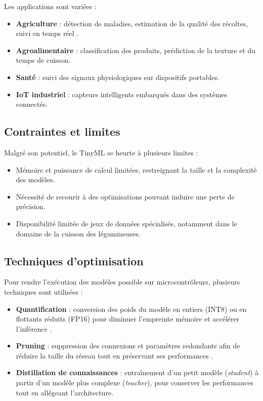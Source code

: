 Les applications sont variées :
\begin{itemize}
	\item \textbf{Agriculture} : détection de maladies, estimation de la qualité des récoltes, suivi en temps réel \cite{moeketsi2025, kimutaiforster2024}.
	\item \textbf{Agroalimentaire} : classification des produits, prédiction de la texture et du temps de cuisson.
	\item \textbf{Santé} : suivi des signaux physiologiques sur dispositifs portables.
	\item \textbf{IoT industriel} : capteurs intelligents embarqués dans des systèmes connectés.
\end{itemize}

\subsection{Contraintes et limites}
Malgré son potentiel, le TinyML se heurte à plusieurs limites :
\begin{itemize}
	\item Mémoire et puissance de calcul limitées, restreignant la taille et la complexité des modèles.
	\item Nécessité de recourir à des optimisations pouvant induire une perte de précision.
	\item Disponibilité limitée de jeux de données spécialisés, notamment dans le domaine de la cuisson des légumineuses.
\end{itemize}

\subsection{Techniques d’optimisation}
Pour rendre l’exécution des modèles possible sur microcontrôleurs, plusieurs techniques sont utilisées :
\begin{itemize}
	\item \textbf{Quantification} : conversion des poids du modèle en entiers (INT8) ou en flottants réduits (FP16) pour diminuer l’empreinte mémoire et accélérer l’inférence \cite{jacob2018quantization}.
	\item \textbf{Pruning} : suppression des connexions et paramètres redondants afin de réduire la taille du réseau tout en préservant ses performances \cite{han2016deep}.
	\item \textbf{Distillation de connaissances} : entraînement d’un petit modèle (\textit{student}) à partir d’un modèle plus complexe (\textit{teacher}), pour conserver les performances tout en allégeant l’architecture.
\end{itemize}

